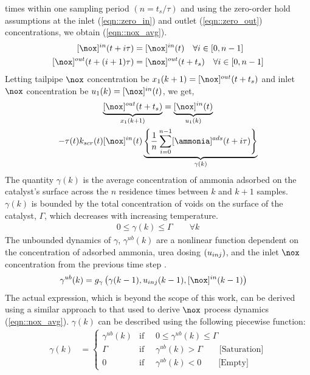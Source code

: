 times within one sampling period $(n= t_s/\tau)$ and using the zero-order hold assumptions at the inlet
(\ref{eqn::zero_in}) and outlet (\ref{eqn::zero_out}) concentrations, we obtain (\ref{eqn::nox_avg}).
\begin{align}
        \con{\nox}^{in} (t + i \tau)      & = \con{\nox}^{in}(t) \quad \forall i \in [0, n-1]  \label{eqn::zero_in}        \\
        \con{\nox}^{out} (t + (i+1) \tau) & = \con{\nox}^{out}(t + t_s) \quad \forall i \in [0, n-1] \label{eqn::zero_out}
\end{align}
Letting tailpipe $\nox$ concentration be $x_1(k+1) = \con{\nox}^{out}(t+t_s)$ and inlet $\nox$ concentration be $u_1(k) = \con{\nox}^{in}(t)$, we get,
\begin{multline}
        \underbrace{\con{\nox}^{out}(t+t_s)}_{x_1(k+1)} = \underbrace{\con{\nox}^{in}(t)}_{u_1(k)} \\
        - \tau(t) k_{scr}(t) \con{\nox}^{in}(t) \underbrace{\lrf{\frac{1}{n} \sum_{i = 0}^{n-1} \con{\ammonia}^{ads}(t + i \tau)}}_{\gamma(k)}
        \label{eqn::nox_avg}
\end{multline}
%
%
The quantity $\gamma(k)$ is the average concentration of ammonia adsorbed on the catalyst's surface across the $n$ residence times between $k$ and $k+1$ samples. $\gamma(k)$ is bounded by the total concentration of voids on the surface of the catalyst, $\Gamma$, which decreases with increasing temperature.
\begin{align}
        0 \leq \gamma(k) \leq \Gamma \qquad \forall k
\end{align}
The unbounded dynamics of $\gamma$, $\gamma^{ub}(k)$ are a nonlinear function dependent on the concentration of adsorbed ammonia, urea dosing $\left( u_{inj} \right)$, and the inlet $\nox$ concentration from the previous time step \cite{charla2026board}.
\begin{align}
        \gamma^{ub}(k) & = g_{\gamma} \lr{ \gamma(k-1), u_{inj}(k-1), \con{\nox}^{in}(k-1) }
\end{align}
The actual expression, which is beyond the scope of this work, can be derived using a similar approach to that used to derive
$\nox$ process dynamics (\ref{eqn::nox_avg}). $\gamma(k)$ can be described using the following piecewise
function:
\begin{align}
        \gamma(k) & =
        \begin{cases}
                \gamma^{ub}(k) & \text{if } \quad 0 \leq \gamma^{ub}(k) \leq \Gamma                  \\
                \Gamma         & \text{if } \quad \gamma^{ub}(k) > \Gamma \qquad \text{[Saturation]} \\
                0              & \text{if } \quad \gamma^{ub}(k) < 0 \qquad \text{[Empty]}
        \end{cases}
\end{align}
